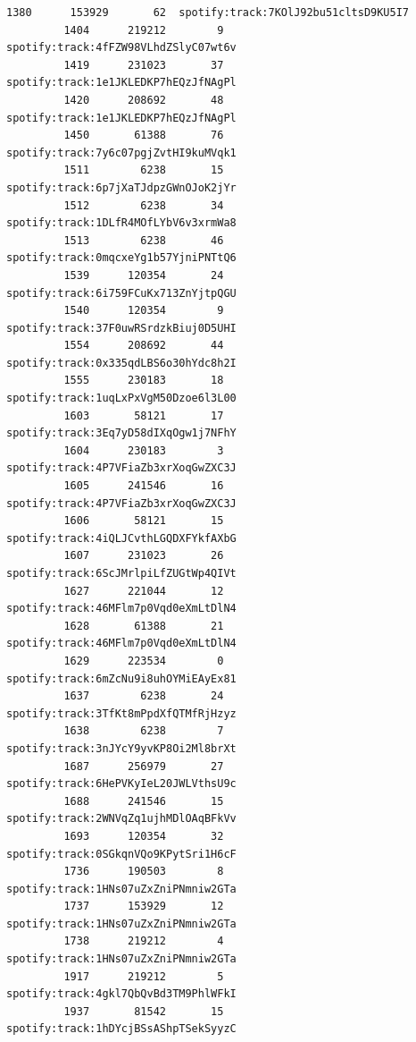 \documentclass[11pt]{article}
\begin{document}
\begin{Verbatim}[commandchars=\\\{\}]
         1380      153929       62  spotify:track:7KOlJ92bu51cltsD9KU5I7   
         1404      219212        9  spotify:track:4fFZW98VLhdZSlyC07wt6v   
         1419      231023       37  spotify:track:1e1JKLEDKP7hEQzJfNAgPl   
         1420      208692       48  spotify:track:1e1JKLEDKP7hEQzJfNAgPl   
         1450       61388       76  spotify:track:7y6c07pgjZvtHI9kuMVqk1   
         1511        6238       15  spotify:track:6p7jXaTJdpzGWnOJoK2jYr   
         1512        6238       34  spotify:track:1DLfR4MOfLYbV6v3xrmWa8   
         1513        6238       46  spotify:track:0mqcxeYg1b57YjniPNTtQ6   
         1539      120354       24  spotify:track:6i759FCuKx713ZnYjtpQGU   
         1540      120354        9  spotify:track:37F0uwRSrdzkBiuj0D5UHI   
         1554      208692       44  spotify:track:0x335qdLBS6o30hYdc8h2I   
         1555      230183       18  spotify:track:1uqLxPxVgM50Dzoe6l3L00   
         1603       58121       17  spotify:track:3Eq7yD58dIXqOgw1j7NFhY   
         1604      230183        3  spotify:track:4P7VFiaZb3xrXoqGwZXC3J   
         1605      241546       16  spotify:track:4P7VFiaZb3xrXoqGwZXC3J   
         1606       58121       15  spotify:track:4iQLJCvthLGQDXFYkfAXbG   
         1607      231023       26  spotify:track:6ScJMrlpiLfZUGtWp4QIVt   
         1627      221044       12  spotify:track:46MFlm7p0Vqd0eXmLtDlN4   
         1628       61388       21  spotify:track:46MFlm7p0Vqd0eXmLtDlN4   
         1629      223534        0  spotify:track:6mZcNu9i8uhOYMiEAyEx81   
         1637        6238       24  spotify:track:3TfKt8mPpdXfQTMfRjHzyz   
         1638        6238        7  spotify:track:3nJYcY9yvKP8Oi2Ml8brXt   
         1687      256979       27  spotify:track:6HePVKyIeL20JWLVthsU9c   
         1688      241546       15  spotify:track:2WNVqZq1ujhMDlOAqBFkVv   
         1693      120354       32  spotify:track:0SGkqnVQo9KPytSri1H6cF   
         1736      190503        8  spotify:track:1HNs07uZxZniPNmniw2GTa   
         1737      153929       12  spotify:track:1HNs07uZxZniPNmniw2GTa   
         1738      219212        4  spotify:track:1HNs07uZxZniPNmniw2GTa   
         1917      219212        5  spotify:track:4gkl7QbQvBd3TM9PhlWFkI   
         1937       81542       15  spotify:track:1hDYcjBSsAShpTSekSyyzC   
         

\end{Verbatim}
\end{document}
